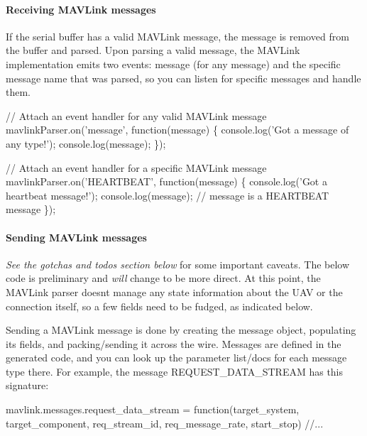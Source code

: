 \paragraph*{Receiving M\+A\+V\+Link messages}

If the serial buffer has a valid M\+A\+V\+Link message, the message is removed from the buffer and parsed. Upon parsing a valid message, the M\+A\+V\+Link implementation emits two events\+: {\ttfamily message} (for any message) and the specific message name that was parsed, so you can listen for specific messages and handle them.


\begin{DoxyCode}
// Attach an event handler for any valid MAVLink message
mavlinkParser.on('message', function(message) \{
    console.log('Got a message of any type!');
    console.log(message);
\});

// Attach an event handler for a specific MAVLink message
mavlinkParser.on('HEARTBEAT', function(message) \{
    console.log('Got a heartbeat message!');
    console.log(message); // message is a HEARTBEAT message
\});
\end{DoxyCode}


\paragraph*{Sending M\+A\+V\+Link messages}

{\itshape See the gotcha\textquotesingle{}s and todo\textquotesingle{}s section below} for some important caveats. The below code is preliminary and {\itshape will} change to be more direct. At this point, the M\+A\+V\+Link parser doesn\textquotesingle{}t manage any state information about the U\+AV or the connection itself, so a few fields need to be fudged, as indicated below.

Sending a M\+A\+V\+Link message is done by creating the message object, populating its fields, and packing/sending it across the wire. Messages are defined in the generated code, and you can look up the parameter list/docs for each message type there. For example, the message {\ttfamily R\+E\+Q\+U\+E\+S\+T\+\_\+\+D\+A\+T\+A\+\_\+\+S\+T\+R\+E\+AM} has this signature\+:


\begin{DoxyCode}
mavlink.messages.request\_data\_stream = function(target\_system, target\_component, req\_stream\_id,
       req\_message\_rate, start\_stop) //...
\end{DoxyCode}


